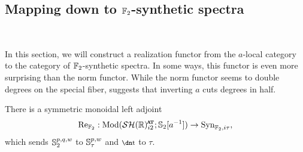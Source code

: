 \subsection{Mapping down to $\operatorname{\mathbb{F}}_2$-synthetic spectra}\

In this section, we will construct a realization functor from the $a$-local category to the category of $\operatorname{\mathbb{F}}_2$-synthetic spectra. In some ways, this functor is even more surprising than the norm functor. While the norm functor seems to double degrees on the special fiber,  suggests that inverting $a$ cuts degrees in half.  

\begin{prop} \label{prop:a-inv-compare}
  There is a symmetric monoidal left adjoint
  \[ \Re_{\F_2} : \mathrm{Mod}( \SHRat ; \Ss_2 [a^{-1}] ) \to \Syn_{\F_2, i\tau}, \]
  which sends $\operatorname{\mathbb{S}}_2^{p,q,w}$ to $\operatorname{\mathbb{S}}_\tau^{p,w}$ and $\ta$ to $\tau$.
\end{prop}


